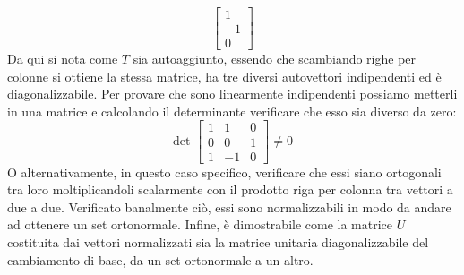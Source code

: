 \begin{exmp}
\begin{equation*}
\begin{bmatrix}
            1 \\ -1 \\ 0
        \end{bmatrix}
    \end{equation*}
    Da qui si nota come $T$ sia autoaggiunto, essendo che scambiando righe per colonne si ottiene la stessa matrice, ha tre diversi autovettori indipendenti ed è diagonalizzabile. Per provare che sono linearmente indipendenti possiamo metterli in una matrice e calcolando il determinante verificare che esso sia diverso da zero:
    \begin{equation*}
        \text{det }
        \begin{bmatrix}
            1 & 1 & 0 \\
            0 & 0 & 1 \\
            1 & -1 & 0
        \end{bmatrix} \neq 0
    \end{equation*}
    O alternativamente, in questo caso specifico, verificare che essi siano ortogonali tra loro moltiplicandoli scalarmente con il prodotto riga per colonna tra vettori a due a due. Verificato banalmente ciò, essi sono normalizzabili in modo da andare ad ottenere un set ortonormale. Infine, è dimostrabile come la matrice $U$ costituita dai vettori normalizzati sia la matrice unitaria diagonalizzabile del cambiamento di base, da un set ortonormale a un altro.
\end{exmp}


